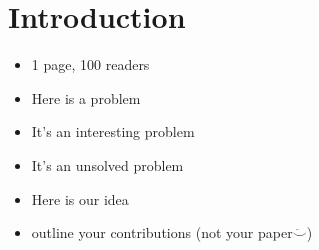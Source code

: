 
\section{Introduction}
\label{sec:introduction}

\begin{itemize}
	\item 1 page, 100 readers
	\item Here is a problem
	\item It's an interesting problem
	\item It's an unsolved problem
	\item Here is our idea
	\item outline your contributions (not your paper$\ddot\smile$)
\end{itemize}